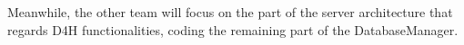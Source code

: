{%
Meanwhile, the other team will focus on the part of the server architecture that regards D4H functionalities, coding the remaining part of the DatabaseManager.





}
